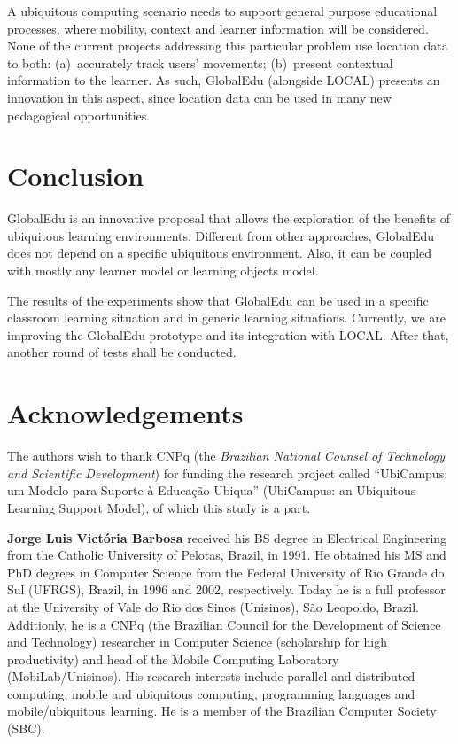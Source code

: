 \documentclass[5p,authoryear]{elsarticle}
\begin{document}
A ubiquitous computing scenario needs to support general purpose educational
processes, where mobility, context and learner information will be considered.
None of the current projects \citep{rogers05,ogata03} addressing this
particular problem use location data to both: (a)~accurately track users'
movements; (b)~present contextual information to the learner. As such,
GlobalEdu (alongside LOCAL) presents an innovation in this aspect, since
location data can be used in many new pedagogical opportunities.


\section{Conclusion} \label{sec:conclusion}

GlobalEdu is an innovative proposal that allows the exploration of the benefits
of ubiquitous learning environments. Different from other approaches, GlobalEdu
does not depend on a specific ubiquitous environment. Also, it can be coupled
with mostly any learner model or learning objects model. 

The results of the experiments show that GlobalEdu can be used in a specific
classroom learning situation and in generic learning situations. Currently, we
are improving the GlobalEdu prototype and its integration with LOCAL. After
that, another round of tests shall be conducted.

%
% 
\section*{Acknowledgements}

The authors wish to thank CNPq (the \emph{Brazilian National Counsel of
Technology and Scientific Development}) for funding the research project called
``UbiCampus: um Modelo para Suporte à Educação Ubiqua'' (UbiCampus: an
Ubiquitous Learning Support Model), of which this study is a part.

%
%
 



%
%
\vspace{5mm}
\footnotesize
\noindent
\textbf{Jorge Luis Vict\'{o}ria Barbosa} received his BS degree in Electrical
Engineering from the Catholic University of Pelotas, Brazil, in 1991. He
obtained his MS and PhD degrees in Computer Science from the Federal University
of Rio Grande do Sul (UFRGS), Brazil, in 1996 and 2002, respectively. Today he
is a full professor at the University of Vale do Rio dos Sinos (Unisinos),
S\~{a}o Leopoldo, Brazil. Additionly, he is a CNPq (the Brazilian Council for
the Development of Science and Technology) researcher in Computer Science
(scholarship for high productivity) and head of the Mobile Computing Laboratory
(MobiLab/Unisinos).  His research interests include parallel and distributed
computing, mobile and ubiquitous computing, programming languages and
mobile/ubiquitous learning. He is a member of the Brazilian Computer Society
(SBC).
\end{document}
